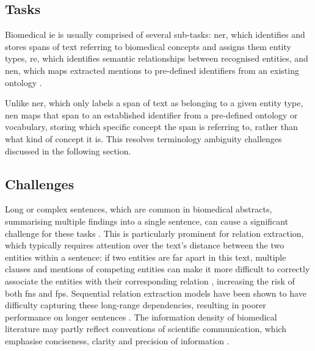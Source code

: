 \subsection{Tasks}
\label{subsec:lit:tasks}
Biomedical \gls{ie} is usually comprised of several sub-tasks: \gls{ner}, which identifies and stores spans of text referring to biomedical concepts and assigns them entity types, \gls{re}, which identifies semantic relationships between recognised entities, and \gls{nen}, which maps extracted mentions to pre-defined identifiers from an existing ontology \cite{perera2020_ie_introduction, li2017cnn}.

Unlike \gls{ner}, which only labels a span of text as belonging to a given entity type, \gls{nen} maps that span to an established identifier from a pre-defined ontology or vocabulary, storing which specific concept the span is referring to, rather than what kind of concept it is. This resolves terminology ambiguity challenges discussed in the following section.

\subsection{Challenges}
\label{subsec:lit:challenges}
Long or complex sentences, which are common in biomedical abstracts, summarising multiple findings into a single sentence, can cause a significant challenge for these tasks \cite{segura2011linguistic}. This is particularly prominent for relation extraction, which typically requires attention over the text's distance between the two entities within a sentence: if two entities are far apart in this text, multiple clauses and mentions of competing entities can make it more difficult to correctly associate the entities with their corresponding relation \cite{hu2024hierarchical}, increasing the risk of both \glspl{fn} and \glspl{fp}. Sequential relation extraction models have been shown to have difficulty capturing these long-range dependencies, resulting in poorer performance on longer sentences \cite{fei2021span}. The information density of biomedical literature may partly reflect conventions of scientific communication, which emphasise conciseness, clarity and precision of information \cite{flanagin2024aspects}.

